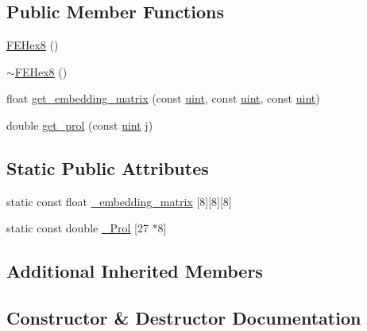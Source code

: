 \subsection*{Public Member Functions}
\begin{DoxyCompactItemize}
\item 
\mbox{\hyperlink{classfemus_1_1_f_e_hex8_a096b681567770f72bb2d4a7a18d260ca}{F\+E\+Hex8}} ()
\item 
\mbox{\hyperlink{classfemus_1_1_f_e_hex8_a7133b27555c7c730281cc4c36ea2ac6d}{$\sim$\+F\+E\+Hex8}} ()
\item 
float \mbox{\hyperlink{classfemus_1_1_f_e_hex8_a6e1819ed6e7597f1109f3d314d1c1f1b}{get\+\_\+embedding\+\_\+matrix}} (const \mbox{\hyperlink{_typedefs_8hpp_a91ad9478d81a7aaf2593e8d9c3d06a14}{uint}}, const \mbox{\hyperlink{_typedefs_8hpp_a91ad9478d81a7aaf2593e8d9c3d06a14}{uint}}, const \mbox{\hyperlink{_typedefs_8hpp_a91ad9478d81a7aaf2593e8d9c3d06a14}{uint}})
\item 
double \mbox{\hyperlink{classfemus_1_1_f_e_hex8_aa84066edfa5cac347255b6e8f2098cf5}{get\+\_\+prol}} (const \mbox{\hyperlink{_typedefs_8hpp_a91ad9478d81a7aaf2593e8d9c3d06a14}{uint}} j)
\end{DoxyCompactItemize}
\subsection*{Static Public Attributes}
\begin{DoxyCompactItemize}
\item 
static const float \mbox{\hyperlink{classfemus_1_1_f_e_hex8_aea2ef04528935355545d3ebe2b2bf051}{\+\_\+embedding\+\_\+matrix}} \mbox{[}8\mbox{]}\mbox{[}8\mbox{]}\mbox{[}8\mbox{]}
\item 
static const double \mbox{\hyperlink{classfemus_1_1_f_e_hex8_a282ec3050c8490f8195b908895148c58}{\+\_\+\+Prol}} \mbox{[}27 $\ast$8\mbox{]}
\end{DoxyCompactItemize}
\subsection*{Additional Inherited Members}


\subsection{Constructor \& Destructor Documentation}
\mbox{\label{classfemus_1_1_f_e_hex8_a096b681567770f72bb2d4a7a18d260ca}} 
